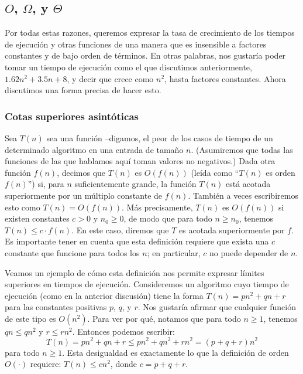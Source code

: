 \documentclass[a4paper, 12pt]{book}
\theoremstyle{dotless}
\begin{document}
\subsection*{$O$, $\Omega$, y $\Theta$}

Por todas estas razones, queremos expresar la tasa de crecimiento de los tiempos de ejecución y otras funciones de una manera que es insensible a factores constantes y de bajo orden de términos. En otras palabras, nos gustaría poder tomar un tiempo de ejecución como el que discutimos anteriormente, $1.62n^2 + 3.5n + 8$, y decir que crece como $n^2$, hasta factores constantes. Ahora discutimos una forma precisa de hacer esto.

\subsubsection*{Cotas superiores asintóticas}
Sea $T(n)$ sea una función --digamos, el peor de los casos de tiempo de un determinado algoritmo en una entrada de tamaño $n$. (Asumiremos que todas las funciones de las que hablamos aquí toman valores no negativos.) Dada otra función $f(n)$, decimos que $T(n)$ es $O(f(n))$ (leída como ``$T(n)$ es orden $f(n)$'') si, para $n$ suficientemente grande, la función $T(n)$ está acotada superiormente por un múltiplo constante de $f(n)$. También a veces escribiremos esto como $T(n) = O(f(n))$. Más precisamente, $T(n)$ es $O(f(n))$ si existen constantes $c > 0$ y $n_0 \geq 0$, de modo que para todo $n \geq n_0$, tenemos $T(n) \leq c \cdot f(n)$. En este caso, diremos que $T$ es acotada superiormente por $f$. Es importante tener en cuenta que esta definición requiere que exista una $c$ constante que funcione para todos los $n$; en particular, $c$ no puede depender de $n$. 

Veamos un ejemplo de cómo esta definición nos permite expresar límites superiores en tiempos de ejecución. Consideremos un algoritmo cuyo tiempo de ejecución (como en la anterior discusión) tiene la forma $T(n) = pn^2 + qn + r$ para las constantes positivas $p$, $q$, y $r$. Nos gustaría afirmar que cualquier función de este tipo es $O(n^2)$. Para ver por qué, notamos que para todo $n \geq 1$, tenemos $qn \leq qn^2$ y $r ≤ rn^2$. Entonces podemos escribir: 
%
$$T(n) = pn^2 + qn + r \leq pn^2+ qn^2 + rn^2 = (p + q + r)n^2$$ 
%
para todo $n \geq 1$. Esta desigualdad es exactamente lo que la definición de orden $O(\cdot)$ requiere: $T(n) \leq cn^2$, donde $c = p + q + r$. 
\end{document}
